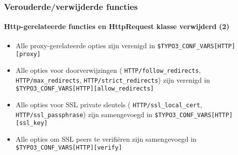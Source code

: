 \begin{frame}[fragile]
	\frametitle{Verouderde/verwijderde functies}
	\framesubtitle{Http-gerelateerde functies en HttpRequest klasse verwijderd (2)}

	\begin{itemize}

		\item Alle proxy-gerelateerde opties zijn verenigd in\newline
			\small\texttt{\$TYPO3\_CONF\_VARS[HTTP][proxy]}\normalsize

		\item Alle opties voor doorverwijzingen
			(\small
				\texttt{HTTP/follow\_redirects},
				\texttt{HTTP/max\_redirects},
				\texttt{HTTP/strict\_redirects}\normalsize)
			zijn verenigd in
			\small
				\texttt{\$TYPO3\_CONF\_VARS[HTTP][allow\_redirects]}
			\normalsize

		\item Alle opties voor SSL private sleutels
			(\small
				\texttt{HTTP/ssl\_local\_cert},
				\texttt{HTTP/ssl\_passphrase}\normalsize)
			zijn samengevoegd in
			\small
				\texttt{\$TYPO3\_CONF\_VARS[HTTP][ssl\_key]}
			\normalsize

		\item Alle opties om SSL peers te verifiëren zijn samengevoegd in
			\small
				\texttt{\$TYPO3\_CONF\_VARS[HTTP][verify]}
			\normalsize

	\end{itemize}

\end{frame}

